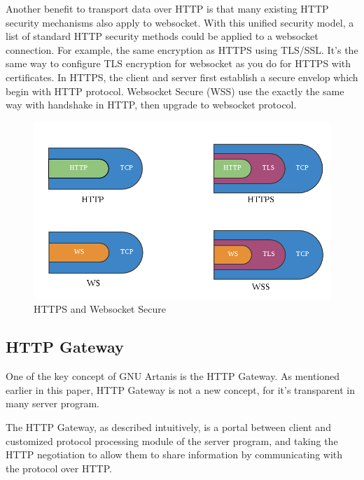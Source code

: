 \documentclass[preprint,numbers,numberedpars,10pt]{sigplanconf}
\begin{document}
Another benefit to transport data over HTTP is that many existing HTTP security mechanisms also apply to websocket.
With this unified security model, a list of standard HTTP security methods could be applied to a websocket connection.
For example, the same encryption as HTTPS using TLS/SSL. It's the same way to configure TLS encryption for websocket as you do for HTTPS with
certificates. In HTTPS, the client and server first establish a secure envelop which begin with HTTP protocol. Websocket Secure (WSS) use
the exactly the same way with handshake in HTTP, then upgrade to websocket protocol. 

\begin{figure}[tbph]
  \centering
  \label{fig:wss}
  \includegraphics[scale=0.3]{wss.png}
  \caption{HTTPS and Websocket Secure}
\end{figure}

\subsection{HTTP Gateway} \label{HTTP Gateway}

One of the key concept of GNU Artanis is the HTTP Gateway. As mentioned earlier in this paper, HTTP Gateway is not a new concept,
for it's transparent in many server program.

The HTTP Gateway, as described intuitively, is a portal between client and customized protocol processing module of the server program,
and taking the HTTP negotiation to allow them to share information by communicating with the protocol over HTTP.
\end{document}
